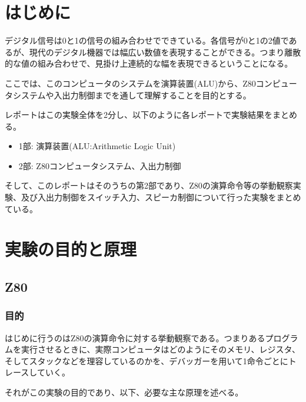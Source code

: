 \documentclass[11pt,a4j]{jsarticle}
\title{}
\author{1413176 三村幸祐}
\date{ \, }
\begin{document}
  
 \tableofcontents \newpage
  
  
 \section{はじめに}
  デジタル信号は0と1の信号の組み合わせでできている。各信号が0と1の2値であるが、現代のデジタル機器では幅広い数値を表現することができる。つまり離散的な値の組み合わせで、見掛け上連続的な幅を表現できるということになる。
  
  ここでは、このコンピュータのシステムを演算装置(ALU)から、Z80コンピュータシステムや入出力制御までを通して理解することを目的とする。
  
  レポートはこの実験全体を2分し、以下のように各レポートで実験結果をまとめる。
  \begin{itemize}
  \item 1部: 演算装置(ALU:Arithmetic Logic Unit)
  \item 2部: Z80コンピュータシステム、入出力制御
  \end{itemize}
  
  そして、このレポートはそのうちの第2部であり、Z80の演算命令等の挙動観察実験、及び入出力制御をスイッチ入力、スピーカ制御について行った実験をまとめている。
  
  
 \section{実験の目的と原理}
  
  \subsection{Z80}
   
   \subsubsection{目的}
   はじめに行うのはZ80の演算命令に対する挙動観察である。つまりあるプログラムを実行させるときに、実際コンピュータはどのようにそのメモリ、レジスタ、そしてスタックなどを理容しているのかを、デバッガーを用いて1命令ごとにトレースしていく。
   
   それがこの実験の目的であり、以下、必要な主な原理を述べる。
   
   \subsubsection{}
   
\end{document}

